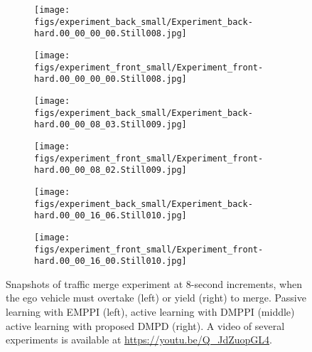 \documentclass[letterpaper, 10 pt, conference]{IEEEconf}
\begin{document}
\begin{figure*}[th]
    \centering
    \begin{subfigure}{0.99\columnwidth}
        \texttt{[image: figs/experiment\_back\_small/Experiment\_back-hard.00\_00\_00\_00.Still008.jpg]}
    \end{subfigure}
% 
    \begin{subfigure}{0.99\columnwidth}
        \texttt{[image: figs/experiment\_front\_small/Experiment\_front-hard.00\_00\_00\_00.Still008.jpg]}
    \end{subfigure}
% 
% 
    \begin{subfigure}{0.99\columnwidth}
        \texttt{[image: figs/experiment\_back\_small/Experiment\_back-hard.00\_00\_08\_03.Still009.jpg]}
    \end{subfigure}
% 
    \begin{subfigure}{0.99\columnwidth}
        \texttt{[image: figs/experiment\_front\_small/Experiment\_front-hard.00\_00\_08\_02.Still009.jpg]}
    \end{subfigure}
% 
% 
    \begin{subfigure}{0.99\columnwidth}
        \texttt{[image: figs/experiment\_back\_small/Experiment\_back-hard.00\_00\_16\_06.Still010.jpg]}
    \end{subfigure}
% 
    \begin{subfigure}{0.99\columnwidth}
        \texttt{[image: figs/experiment\_front\_small/Experiment\_front-hard.00\_00\_16\_00.Still010.jpg]}
    \end{subfigure}
    \caption{Snapshots of traffic merge experiment at 8-second increments, when the ego vehicle must overtake (left) or yield (right) to merge. Passive learning with EMPPI (left), active learning with DMPPI (middle) active learning with proposed DMPD (right). A video of several experiments is available at \url{https://youtu.be/Q_JdZuopGL4}.}
    \label{fig:experiment}
\end{figure*}
\end{document}

